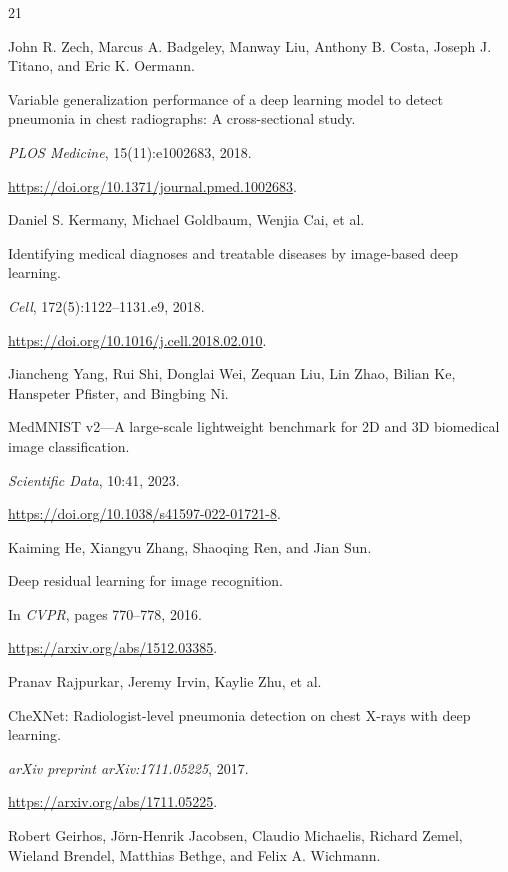 \begingroup
\raggedright
\begin{thebibliography}{21}

John R. Zech, Marcus A. Badgeley, Manway Liu, Anthony B. Costa, Joseph J. Titano, and Eric K. Oermann.

Variable generalization performance of a deep learning model to detect pneumonia in chest radiographs: A cross-sectional study.

\emph{PLOS Medicine}, 15(11):e1002683, 2018.

\url{https://doi.org/10.1371/journal.pmed.1002683}.


Daniel S. Kermany, Michael Goldbaum, Wenjia Cai, et al.

Identifying medical diagnoses and treatable diseases by image-based deep learning.

\emph{Cell}, 172(5):1122--1131.e9, 2018.

\url{https://doi.org/10.1016/j.cell.2018.02.010}.


Jiancheng Yang, Rui Shi, Donglai Wei, Zequan Liu, Lin Zhao, Bilian Ke, Hanspeter Pfister, and Bingbing Ni.

MedMNIST v2---A large-scale lightweight benchmark for 2D and 3D biomedical image classification.

\emph{Scientific Data}, 10:41, 2023.

\url{https://doi.org/10.1038/s41597-022-01721-8}.


Kaiming He, Xiangyu Zhang, Shaoqing Ren, and Jian Sun.

Deep residual learning for image recognition.

In \emph{CVPR}, pages 770--778, 2016.

\url{https://arxiv.org/abs/1512.03385}.


Pranav Rajpurkar, Jeremy Irvin, Kaylie Zhu, et al.

CheXNet: Radiologist-level pneumonia detection on chest X-rays with deep learning.

\emph{arXiv preprint arXiv:1711.05225}, 2017.

\url{https://arxiv.org/abs/1711.05225}.


Robert Geirhos, J\"orn-Henrik Jacobsen, Claudio Michaelis, Richard Zemel, Wieland Brendel, Matthias Bethge, and Felix A. Wichmann.


\end{thebibliography}
